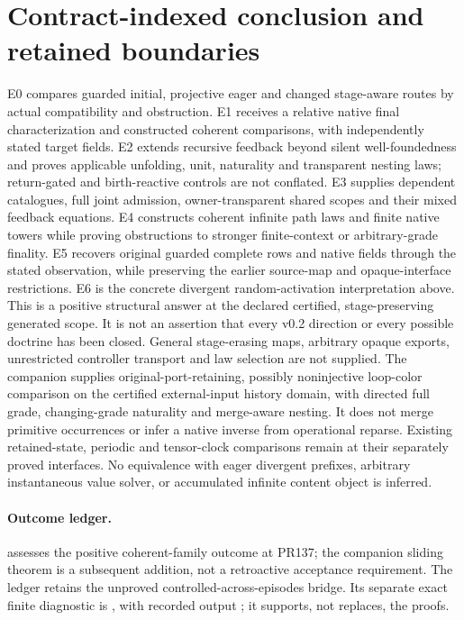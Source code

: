 \documentclass{article}
\begin{document}
\section{Contract-indexed conclusion and retained boundaries}
E0 compares guarded initial, projective eager and changed stage-aware routes by actual compatibility and obstruction. E1 receives a relative native final characterization and constructed coherent comparisons, with independently stated target fields. E2 extends recursive feedback beyond silent well-foundedness and proves applicable unfolding, unit, naturality and transparent nesting laws; return-gated and birth-reactive controls are not conflated. E3 supplies dependent catalogues, full joint admission, owner-transparent shared scopes and their mixed feedback equations. E4 constructs coherent infinite path laws and finite native towers while proving obstructions to stronger finite-context or arbitrary-grade finality. E5 recovers original guarded complete rows and native fields through the stated observation, while preserving the earlier source-map and opaque-interface restrictions. E6 is the concrete divergent random-activation interpretation above.
This is a positive structural answer at the declared certified, stage-preserving generated scope. It is not an assertion that every v0.2 direction or every possible doctrine has been closed. General stage-erasing maps, arbitrary opaque exports, unrestricted controller transport and law selection are not supplied. The companion  supplies original-port-retaining, possibly noninjective loop-color comparison on the certified external-input history domain, with directed full grade, changing-grade naturality and merge-aware nesting. It does not merge primitive occurrences or infer a native inverse from operational reparse. Existing retained-state, periodic and tensor-clock comparisons remain at their separately proved interfaces. No equivalence with eager divergent prefixes, arbitrary instantaneous value solver, or accumulated infinite content object is inferred.
\paragraph{Outcome ledger.}  assesses the positive coherent-family outcome at PR137; the companion sliding theorem is a subsequent addition, not a retroactive acceptance requirement. The ledger retains the unproved controlled-across-episodes bridge. Its separate exact finite diagnostic is , with recorded output ; it supports, not replaces, the proofs.
\end{document}
